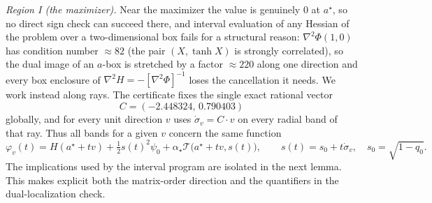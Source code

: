 \documentclass[11pt]{article}
\begin{document}
\emph{Region I (the maximizer).} Near the maximizer the value is genuinely
$0$ at $a^\star$, so no direct sign check can succeed there, and interval evaluation
of any Hessian of the problem over a two-dimensional box fails for a
structural reason: $\nabla^2\Phi(1,0)$ has condition number $\approx 82$
(the pair $(X,\tanh X)$ is strongly correlated), so the dual image of an
$a$-box is stretched by a factor $\approx 220$ along one direction and every
box enclosure of $\nabla^2 H=-[\nabla^2\Phi]^{-1}$ loses the cancellation it
needs. We work instead along rays.  The certificate fixes the single exact
rational vector
\[
 C=(-2.448324,\,0.790403)
\]
globally, and for every unit direction $v$ uses
$\dot\sigma_v=C\cdot v$ on every radial band of that ray.  Thus all bands
for a given $v$ concern the same function
\[
  \varphi_v(t) = H(a^\star+tv) + \tfrac12 s(t)^2\psi_0
     + \alpha_\star \mathcal T\bigl(a^\star+tv, s(t)\bigr),
  \qquad s(t)=s_0+t\dot\sigma_v,\quad s_0=\sqrt{1-q_0} .
\]
The implications used by the interval program are isolated in the next
lemma.  This makes explicit both the matrix-order direction and the
quantifiers in the dual-localization check.
\end{document}
